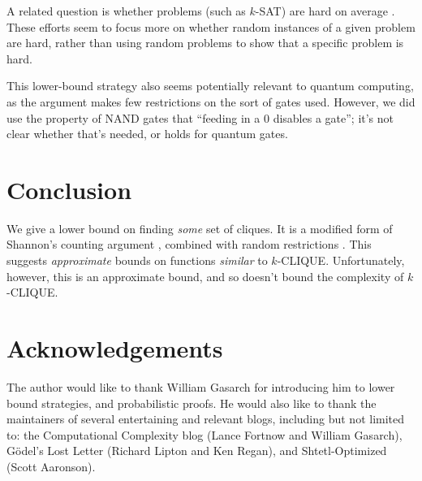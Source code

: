 \documentclass[12pt]{article}
\theoremstyle{definition}
\begin{document}
A related question is whether problems
(such as $k$-SAT) are
hard on average \cite{bogdanov2006average}.
These efforts seem to focus more on whether
random
instances of a given problem are hard, rather
than using random problems to show that
a specific problem is hard.

This lower-bound strategy also seems potentially
relevant to quantum computing,
as the argument makes few restrictions on the sort of gates used.
However, we did use the property of NAND gates that ``feeding in
a 0 disables a gate''; it's not clear whether that's needed,
or holds for quantum gates.

\section{Conclusion}

We give a lower bound on finding {\em some} set of cliques.
It is a modified form of Shannon's counting argument
\cite{shannon_synthesis_1949}, combined with random restrictions
\cite{subbotovskaya1963comparison} \cite{hastad1987lower}.
This suggests {\em approximate} bounds on functions {\em similar} to $k$-CLIQUE.
Unfortunately, however, this is an approximate bound,
and so doesn't bound the complexity of $k$-CLIQUE.

\section{Acknowledgements}

The author would like to thank William Gasarch for introducing him
to lower bound strategies, and probabilistic proofs.
He would also like to thank the maintainers of
several entertaining and relevant blogs, including but
not limited to: the Computational Complexity blog
(Lance Fortnow and William Gasarch), 
G\"odel's Lost Letter (Richard Lipton and Ken Regan),
and Shtetl-Optimized (Scott Aaronson). 



\end{document}
